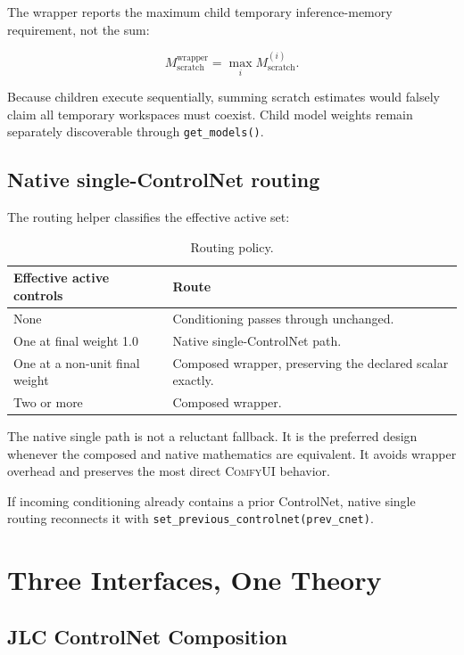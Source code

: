 \documentclass[11pt]{article}
\newcommand{\ComfyUI}{\textsc{ComfyUI}}
\newcommand{\code}[1]{\texttt{#1}}
\begin{document}
The wrapper reports the maximum child temporary inference-memory requirement, not the sum:

\[
M_{\mathrm{scratch}}^{\mathrm{wrapper}} = \max_i M_{\mathrm{scratch}}^{(i)}.
\]

Because children execute sequentially, summing scratch estimates would falsely claim all temporary workspaces must coexist. Child model weights remain separately discoverable through \code{get\_models()}.

\subsection{Native single-ControlNet routing}

The routing helper classifies the effective active set:

\begin{table}[H]
\centering
\caption{Routing policy.}
\begin{tabularx}{\textwidth}{@{}lX@{}}
\toprule
Effective active controls & Route \\
\midrule
None & Conditioning passes through unchanged. \\
One at final weight 1.0 & Native single-ControlNet path. \\
One at a non-unit final weight & Composed wrapper, preserving the declared scalar exactly. \\
Two or more & Composed wrapper. \\
\bottomrule
\end{tabularx}
\end{table}

The native single path is not a reluctant fallback. It is the preferred design whenever the composed and native mathematics are equivalent. It avoids wrapper overhead and preserves the most direct \ComfyUI{} behavior.

If incoming conditioning already contains a prior ControlNet, native single routing reconnects it with \code{set\_previous\_controlnet(prev\_cnet)}.

\section{Three Interfaces, One Theory}

\subsection{JLC ControlNet Composition}
\end{document}
